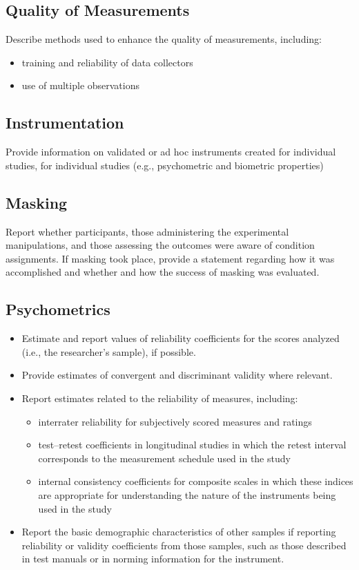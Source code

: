 \documentclass[acmsmall,screen,anonymous,review]{acmart}
\begin{document}
\subsection{Quality of Measurements}
Describe methods used to enhance the quality of measurements, including:
\begin{itemize}
    \item training and reliability of data collectors
    \item use of multiple observations
\end{itemize}

\subsection{Instrumentation}
Provide information on validated or ad hoc instruments created for individual studies, for individual studies (e.g., psychometric and biometric properties)

\subsection{Masking}
Report whether participants, those administering the experimental manipulations, and those assessing the outcomes were aware of condition assignments. If masking took place, provide a statement regarding how it was accomplished and whether and how the success of masking was evaluated. 

\subsection{Psychometrics}
\begin{itemize}
    \item Estimate and report values of reliability coefficients for the scores analyzed (i.e., the researcher’s sample), if possible. 
    \item Provide estimates of convergent and discriminant validity where relevant.
    \item Report estimates related to the reliability of measures, including: 
    \begin{itemize}
        \item interrater reliability for subjectively scored measures and ratings
        \item test--retest coefficients in longitudinal studies in which the retest interval corresponds to the measurement schedule used in the study
        \item internal consistency coefficients for composite scales in which these indices are appropriate for understanding the nature of the instruments being used in the study
    \end{itemize}
    \item Report the basic demographic characteristics of other samples if reporting reliability or validity coefficients from those samples, such as those described in test manuals or in norming information for the instrument.
\end{itemize}
\end{document}
